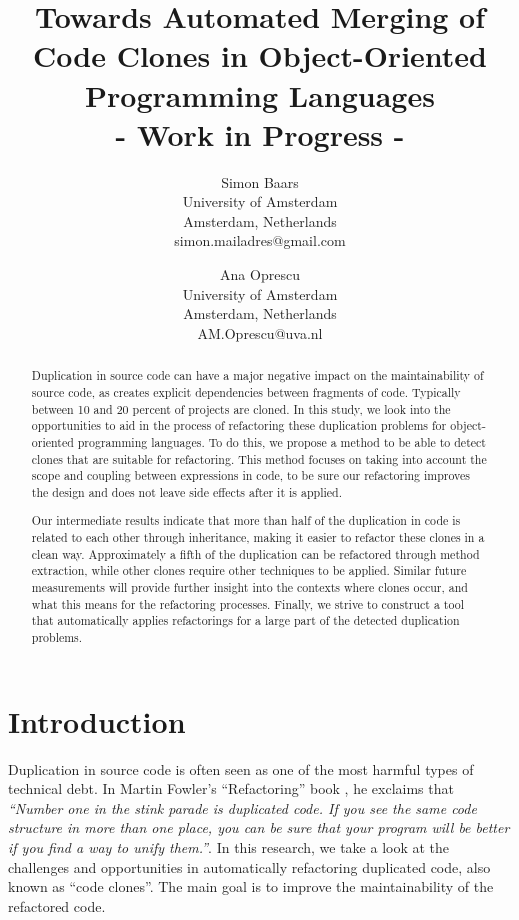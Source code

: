 \documentclass[a4paper]{article}
\title{Towards Automated Merging of Code Clones in Object-Oriented Programming Languages\\- Work in Progress -}
\author{
Simon Baars \\ University of Amsterdam\\
                Amsterdam, Netherlands \\ simon.mailadres@gmail.com
\and
Ana Oprescu \\ University of Amsterdam\\
                Amsterdam, Netherlands \\
                AM.Oprescu@uva.nl
}
\begin{document}
\maketitle

\begin{abstract}
Duplication in source code can have a major negative impact on the maintainability of source code, as creates explicit dependencies between fragments of code. Typically between 10 and 20 percent of projects are cloned. In this study, we look into the opportunities to aid in the process of refactoring these duplication problems for object-oriented programming languages. To do this, we propose a method to be able to detect clones that are suitable for refactoring. This method focuses on taking into account the scope and coupling between expressions in code, to be sure our refactoring improves the design and does not leave side effects after it is applied.

Our intermediate results indicate that more than half of the duplication in code is related to each other through inheritance, making it easier to refactor these clones in a clean way. Approximately a fifth of the duplication can be refactored through method extraction, while other clones require other techniques to be applied. Similar future measurements will provide further insight into the contexts where clones occur, and what this means for the refactoring processes. Finally, we strive to construct a tool that automatically applies refactorings for a large part of the detected duplication problems.
\end{abstract}

\section{Introduction}
Duplication in source code is often seen as one of the most harmful types of technical debt. In Martin Fowler's ``Refactoring'' book \cite{fowler1999refactoring}, he exclaims that \textit{``Number one in the stink parade is duplicated code. If you see the same code structure in more than one place, you can be sure that your program will be better if you find a way to unify them.''}. In this research, we take a look at the challenges and opportunities in automatically refactoring duplicated code, also known as ``code clones''. The main goal is to improve the maintainability of the refactored code.
\end{document}
